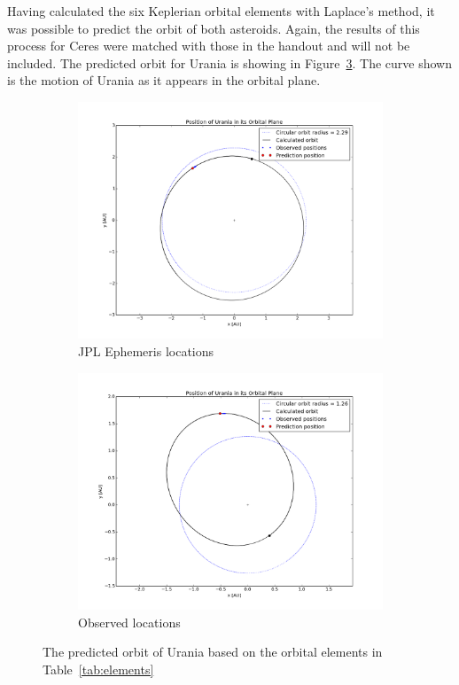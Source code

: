 \documentclass[a4paper,12pt]{article}
\begin{document}
Having calculated the six Keplerian orbital elements with Laplace's method, it was possible to predict the orbit of both asteroids. Again, the results of this process for Ceres were matched with those in the handout and will not be included. The predicted orbit for Urania is showing in Figure~\ref{fig:Orbit}. The curve shown is the motion of Urania as it appears in the orbital plane.

\begin{figure}[!htbp]
\centering
\begin{subfigure}{0.5\textwidth}
  \centering
  \includegraphics[width=\linewidth]{JPLOrbitalPlane.png}
  \caption{JPL Ephemeris locations}
  \label{fig:JPLOrbit}
\end{subfigure}%
\begin{subfigure}{0.5\textwidth}
  \centering
  \includegraphics[width=\linewidth]{UraniaOrbitalPlane.png}
  \caption{Observed locations}
  \label{fig:UraniaOrbit}
\end{subfigure}
\caption{The predicted orbit of Urania based on the orbital elements in Table~\ref{tab:elements}}
\label{fig:Orbit}
\end{figure}
\end{document}
